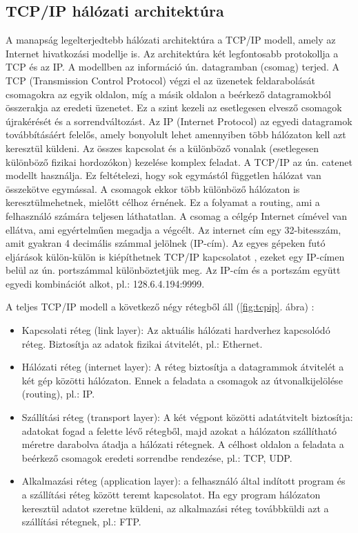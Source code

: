 \documentclass[12pt]{article}
\theoremstyle{plain}
\begin{document}
\subsection {TCP/IP hálózati architektúra}
A manapság legelterjedtebb hálózati architektúra a TCP/IP modell, amely az Internet hivatkozási modellje is. Az architektúra két legfontosabb protokollja a TCP és az IP. A modellben az információ ún. datagramban (csomag) terjed. A TCP (Transmission Control Protocol) végzi el az üzenetek feldarabolását csomagokra az egyik oldalon, míg a másik oldalon a beérkező datagramokból összerakja az eredeti üzenetet. Ez a szint kezeli az esetlegesen elvesző csomagok újrakérését és a sorrendváltozást. Az IP (Internet Protocol) az egyedi datagramok továbbításáért felelős, amely bonyolult lehet amennyiben több hálózaton kell azt keresztül küldeni. Az összes kapcsolat és a különböző vonalak (esetlegesen különböző fizikai hordozókon) kezelése komplex feladat.
A TCP/IP az ún. catenet modellt használja. Ez feltételezi, hogy sok egymástól független hálózat van összekötve egymással. A csomagok ekkor több különböző hálózaton is keresztülmehetnek, mielőtt célhoz érnének. Ez a folyamat a routing, ami a felhasználó számára teljesen láthatatlan. A csomag a célgép Internet címével van ellátva, ami egyértelműen megadja a végcélt. Az internet cím egy 32-bitesszám, amit gyakran 4 decimális számmal jelölnek (IP-cím).  Az egyes gépeken futó eljárások külön-külön is kiépíthetnek TCP/IP kapcsolatot , ezeket egy IP-címen belül az ún. portszámmal különböztetjük meg. Az IP-cím és a portszám együtt egyedi kombinációt alkot, pl.: 128.6.4.194:9999. 
\\ \par
A teljes TCP/IP modell a következő négy rétegből áll (\ref{fig:tcpip}. ábra) :
\begin{itemize}
\item Kapcsolati réteg (link layer): Az aktuális hálózati hardverhez kapcsolódó réteg. Biztosítja az adatok fizikai átvitelét, pl.: Ethernet.
\item Hálózati réteg (internet layer): A réteg biztosítja a datagrammok átvitelét a két gép közötti hálózaton. Ennek a feladata a csomagok az útvonalkijelölése (routing), pl.: IP.
\item Szállítási réteg (transport layer): A két végpont közötti adatátvitelt biztosítja: adatokat fogad a felette lévő rétegből, majd azokat a hálózaton szállítható méretre darabolva átadja a hálózati rétegnek. A célhost oldalon a feladata a beérkező csomagok eredeti sorrendbe rendezése, pl.: TCP, UDP.
\item Alkalmazási réteg (application layer): a felhasználó által indított program és a szállítási réteg között teremt kapcsolatot. Ha egy program hálózaton keresztül adatot szeretne küldeni, az alkalmazási réteg továbbküldi azt a szállítási rétegnek, pl.: FTP.
\end{itemize}
\end{document}
